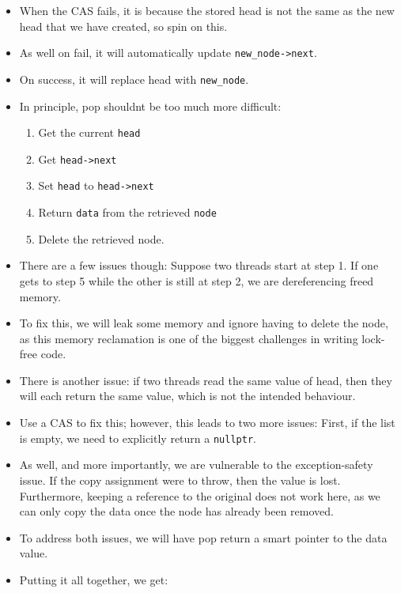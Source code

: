 \documentclass[11pt, a4paper]{article}
\theoremstyle{definition}
\theoremstyle{remark}
\newcommand{\code}[1]{\lstinline|#1|}
\begin{document}
\begin{itemize}
    \item When the CAS fails, it is because the stored head is not the same as the new head that we have created, so spin on this.
    \item As well on fail, it will automatically update \code{new_node->next}.
    \item On success, it will replace head with \code{new_node}.
    \item In principle, pop shouldnt be too much more difficult:
    \begin{enumerate}
        \item Get the current \code{head}
        \item Get \code{head->next}
        \item Set \code{head} to \code{head->next}
        \item Return \code{data} from the retrieved \code{node}
        \item Delete the retrieved node.
    \end{enumerate}
    \item There are a few issues though: Suppose two threads start at step 1. If one gets to step 5 while the other is still at step 2, we are dereferencing freed memory.
    \item To fix this, we will leak some memory and ignore having to delete the node, as this memory reclamation is one of the biggest challenges in writing lock-free code.
    \item There is another issue: if two threads read the same value of head, then they will each return the same value, which is not the intended behaviour. 
    \item Use a CAS to fix this; however, this leads to two more issues: First, if the list is empty, we need to explicitly return a \code{nullptr}. 
    \item As well, and more importantly, we are vulnerable to the exception-safety issue. If the copy assignment were to throw, then the value is lost. Furthermore, keeping a reference to the original does not work here, as we can only copy the data once the node has already been removed. 
    \item To address both issues, we will have pop return a smart pointer to the data value.
    \item Putting it all together, we get:
\end{itemize}
\end{document}
